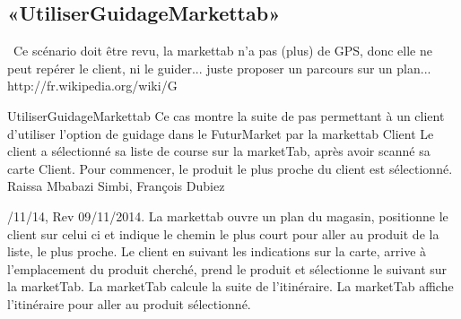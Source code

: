 \subsection{«UtiliserGuidageMarkettab»}
\TODO\ Ce scénario doit être revu, la markettab n'a pas (plus) de GPS, donc elle ne peut repérer le client, ni le guider... juste proposer un parcours sur un plan... http://fr.wikipedia.org/wiki/G%

\startCU
\nom UtiliserGuidageMarkettab
\but Ce cas montre la suite de pas permettant à un client d'utiliser l'option de guidage dans le FuturMarket par la markettab
\acteur Client
\precondition Le client a sélectionné sa liste de course sur la marketTab, après avoir scanné sa carte Client. Pour commencer, le produit le plus proche du client est sélectionné.
\auteur Raissa Mbabazi Simbi, François Dubiez
\date 7/11/14, Rev 09/11/2014.
\nominal %
\startnominal
\etape[UGM:SA1] La markettab ouvre un plan du magasin, positionne le client sur celui ci et indique le chemin le plus court pour aller au produit de la liste, le plus proche.
 Le client en suivant les indications sur la carte, arrive à l'emplacement du produit cherché, prend le produit et sélectionne le suivant sur la marketTab.
\etape La marketTab calcule la suite de l'itinéraire.
\stopnominal
\postcondition La marketTab affiche l'itinéraire pour aller au produit sélectionné.

